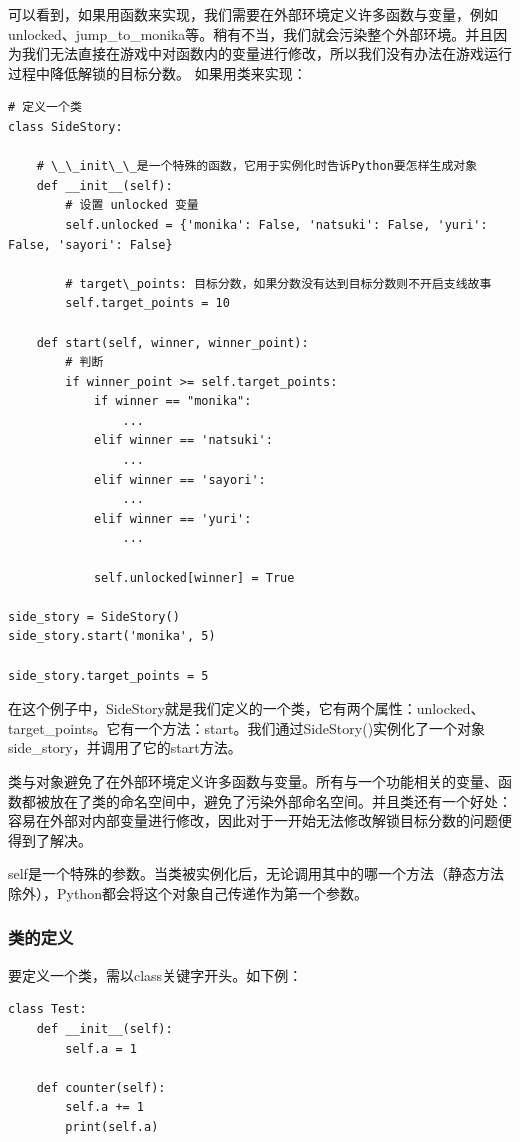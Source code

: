 \documentclass[../../Main.tex]{subfiles}
\begin{document}
可以看到，如果用函数来实现，我们需要在外部环境定义许多函数与变量，例如unlocked、jump\_to\_monika等。稍有不当，我们就会污染整个外部环境。并且因为我们无法直接在游戏中对函数内的变量进行修改，所以我们没有办法在游戏运行过程中降低解锁的目标分数。
如果用类来实现：
\begin{lstlisting}
# 定义一个类
class SideStory:

    # \_\_init\_\_是一个特殊的函数，它用于实例化时告诉Python要怎样生成对象
    def __init__(self):
        # 设置 unlocked 变量
        self.unlocked = {'monika': False, 'natsuki': False, 'yuri': False, 'sayori': False}

        # target\_points: 目标分数，如果分数没有达到目标分数则不开启支线故事
        self.target_points = 10

    def start(self, winner, winner_point):
        # 判断
        if winner_point >= self.target_points:
            if winner == "monika":
                ...
            elif winner == 'natsuki':
                ...
            elif winner == 'sayori':
                ...
            elif winner == 'yuri':
                ...
            
            self.unlocked[winner] = True

side_story = SideStory()
side_story.start('monika', 5)

side_story.target_points = 5
\end{lstlisting}

在这个例子中，SideStory就是我们定义的一个类，它有两个属性：unlocked、target\_points。它有一个方法：start。我们通过SideStory()实例化了一个对象side\_story，并调用了它的start方法。

类与对象避免了在外部环境定义许多函数与变量。所有与一个功能相关的变量、函数都被放在了类的命名空间中，避免了污染外部命名空间。并且类还有一个好处：容易在外部对内部变量进行修改，因此对于一开始无法修改解锁目标分数的问题便得到了解决。

\begin{ExtraKnowledge}
    self是一个特殊的参数。当类被实例化后，无论调用其中的哪一个方法（静态方法除外），Python都会将这个对象自己传递作为第一个参数。
\end{ExtraKnowledge}

\subsubsection{类的定义}
要定义一个类，需以class关键字开头。如下例：

\begin{lstlisting}
class Test:
    def __init__(self):
        self.a = 1

    def counter(self):
        self.a += 1
        print(self.a)
\end{lstlisting}
\end{document}
